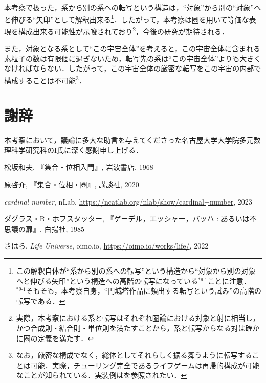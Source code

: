 \documentclass[10pt, a5paper, twoside]{jsarticle}
\theoremstyle{definition}
\begin{document}
		本考察で扱った，系から別の系への転写という構造は，“対象”から別の“対象”へと伸びる“矢印”として解釈出来る\footnote{この解釈自体が“系から別の系への転写”という構造から“対象から別の対象へと伸びる矢印”という構造への高階の転写になっている$^{*9\text{-}1}$ことに注意．\\$^{*9\text{-}1}$そもそも，本考察自身，“円城塔作品に頻出する転写という試み”の高階の転写である．}．したがって，本考察は圏を用いて等価な表現を構成出来る可能性が示唆されており\footnote{実際，本考察における系と転写はそれぞれ圏論における対象と射に相当し，かつ合成則・結合則・単位則を満たすことから，系と転写からなる対は確かに圏の定義を満たす．}，今後の研究が期待される．

		また，対象となる系として“この宇宙全体”を考えると，この宇宙全体に含まれる素粒子の数は有限個に過ぎないため，転写先の系は“この宇宙全体”よりも大きくなければならない．したがって，この宇宙全体の厳密な転写をこの宇宙の内部で構成することは不可能\footnote{なお，厳密な構成でなく，総体としてそれらしく振る舞うように転写することは可能．実際，チューリング完全であるライフゲームは再帰的構成が可能なことが知られている．実装例は\cite{shr}を参照されたい．}．

	\section{謝辞}

		本考察において，議論に多大な助言を与えてくださった名古屋大学大学院多元数理科学研究科のI氏に深く感謝申し上げる．

	\begin{thebibliography}{99}

		 松坂和夫, 『集合・位相入門』, 岩波書店, 1968

		 原啓介, 『集合・位相・圏』, 講談社, 2020

		 \textit{cardinal number}, nLab, \url{https://ncatlab.org/nlab/show/cardinal+number}, 2023

		 ダグラス・R・ホフスタッター, 『ゲーデル，エッシャー，バッハ : あるいは不思議の扉』, 白揚社, 1985

		 さはら, \textit{Life Universe}, oimo.io, \url{https://oimo.io/works/life/}, 2022

	\end{thebibliography}
\end{document}
